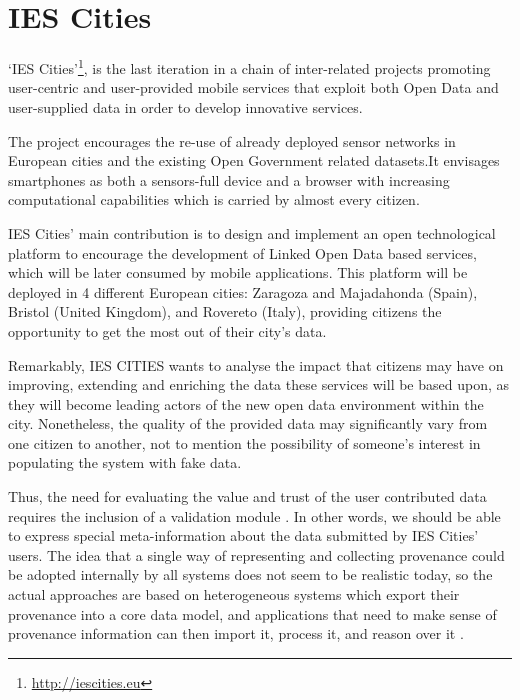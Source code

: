 \section{IES Cities}
\label{sec:ies_cities}

`IES Cities'\footnote{\url{http://iescities.eu}}, is the last iteration in a chain of inter-related projects promoting user-centric and user-provided mobile services that exploit both Open Data and user-supplied data in order to develop innovative services.

The project encourages the re-use of already deployed sensor networks in European cities and the existing Open Government related datasets.It envisages smartphones as both a sensors-full device and a browser with increasing computational capabilities which is carried by almost every citizen.

IES Cities' main contribution is to design and implement an open technological platform to encourage the development of Linked Open Data based services, which will be later consumed by mobile applications. This platform will be deployed in 4 different European cities: Zaragoza and Majadahonda (Spain), Bristol (United Kingdom), and Rovereto (Italy), providing citizens the opportunity to get the most out of their city's data.

Remarkably, IES CITIES wants to analyse the impact that citizens may have on improving, extending and enriching the data these services will be based upon, as they will become leading actors of the new open data environment within the city. Nonetheless, the quality of the provided data may significantly vary from one citizen to another, not to mention the possibility of someone's interest in populating the system with fake data.

Thus, the need for evaluating the value and trust of the user contributed data requires the inclusion of a validation module \cite{hartig_publishing_2010}. In other words, we should be able to express special meta-information about the data submitted by IES Cities' users. The idea that a single way of representing and collecting provenance could be adopted internally by all systems does not seem to be realistic today, so the actual approaches are based on heterogeneous systems which export their provenance into a core data model, and applications that need to make sense of provenance information can then import it, process it, and reason over it \cite{ceolin_trust_2012}.

